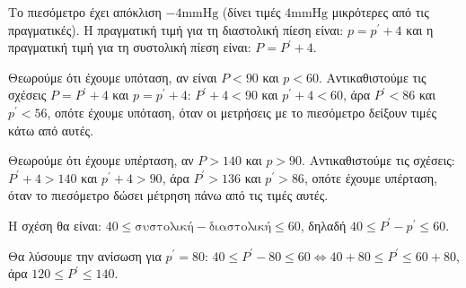 
\begin{alist}
\item Το πιεσόμετρο έχει απόκλιση $-4\text{mmHg}$ (δίνει τιμές $4\text{mmHg}$ μικρότερες από τις πραγματικές).
Η πραγματική τιμή για τη διαστολική πίεση είναι: $p = p^\prime + 4$ και η πραγματική τιμή για τη συστολική πίεση είναι: $P = P^\prime + 4$.

\item Θεωρούμε ότι έχουμε υπόταση, αν είναι $P < 90$ και $p < 60$. Αντικαθιστούμε τις σχέσεις $P = P^\prime + 4$ και $p = p^\prime + 4$:
$P^\prime + 4 < 90$ και $p^\prime + 4 < 60$,
άρα $P^\prime < 86$ και $p^\prime < 56$, οπότε έχουμε υπόταση, όταν οι μετρήσεις με το πιεσόμετρο δείξουν τιμές κάτω από αυτές.

Θεωρούμε ότι έχουμε υπέρταση, αν $P > 140$ και $p > 90$. Αντικαθιστούμε τις σχέσεις:
$P^\prime + 4 > 140$ και $p^\prime + 4 > 90$,
άρα $P^\prime > 136$ και $p^\prime > 86$, οπότε έχουμε υπέρταση, όταν το πιεσόμετρο δώσει μέτρηση πάνω από τις τιμές αυτές.

\item
\begin{rlist}
\item Η σχέση θα είναι: $40 \le \text{συστολική} - \text{διαστολική} \le 60$, δηλαδή
$40 \le P^\prime - p^\prime \le 60$.

\item Θα λύσουμε την ανίσωση για $p^\prime = 80$:
$40 \le P^\prime - 80 \le 60 \Leftrightarrow 40 + 80 \le P^\prime \le 60 + 80$, άρα $120 \le P^\prime \le 140$.
\end{rlist}
\end{alist}

